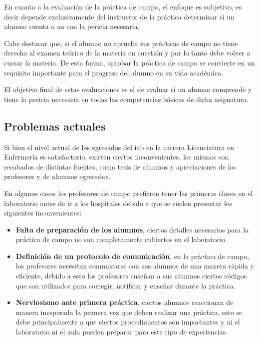 En cuanto a la evaluación de la práctica de campo, el enfoque es
subjetivo, es decir depende exclusivamente del instructor de la práctica
determinar si un alumno cuenta o no con la pericia necesaria.
    
Cabe destacar que, si el alumno no aprueba sus prácticas de campo no tiene 
derecho al examen teórico de la materia en cuestión y por lo tanto debe volver 
a cursar la materia. De esta forma, aprobar la práctica de campo se convierte 
en un requisito importante para el progreso del alumno en su vida académica.

El objetivo final de estas evaluaciones es el de evaluar si un alumno comprende
y tiene la pericia necesaria en todas las competencias básicas de dicha
asignatura.



\subsection{Problemas actuales}
\label{sec:problemas_actuales}

Si bien el nivel actual de los egresados del \Gls{iab} en la carrera
Licenciatura en Enfermería es satisfactorio, existen ciertos inconvenientes, los
mismos son recabados de distintas fuentes, como tesis de
alumnos y apreciaciones de los profesores y de alumnos egresados.

En algunos casos los profesores de campo prefieren tener las primeras clases en 
el laboratorio antes de ir a los hospitales debido a que se suelen presentar 
los siguientes inconvenientes:

\begin{itemize}
    \item \textbf{Falta de preparación de los alumnos}, ciertos detalles necesarios para
        la práctica de campo no son completamente cubiertos en el
        laboratorio.
        
    \item \textbf{Definición de un protocolo de comunicación}, en la práctica de campo,
        los profesores necesitan comunicarse con sus alumnos de una manera
        rápida y eficiente, debido a esto los profesores enseñan a sus alumnos
        ciertos códigos que son utilizados para corregir, notificar y enseñar
        durante la práctica.
        
    \item \textbf{Nerviosismo ante primera práctica}, ciertos alumnos reaccionan de
        manera inesperada la primera vez que deben realizar una práctica, esto
        se debe principalmente a que ciertos procedimientos son impactantes y
        ni el laboratorio ni el aula pueden preparar para este tipo de
        experiencias.
        
\end{itemize}


